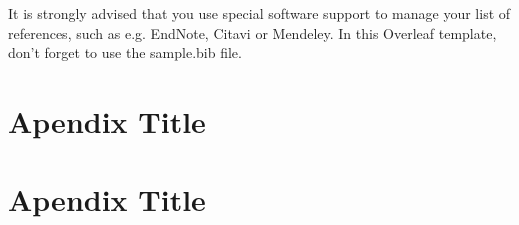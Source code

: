 \documentclass[12pt,twoside]{article}
\begin{document}

It is strongly advised that you use special software support to manage your list of references, such as e.g. EndNote, Citavi or Mendeley. In this Overleaf template, don't forget to use the sample.bib  file.

\newpage
\appendix
\begin{appendices}

\section{Apendix Title}

\section{Apendix Title}

\end{appendices}
\end{document}

